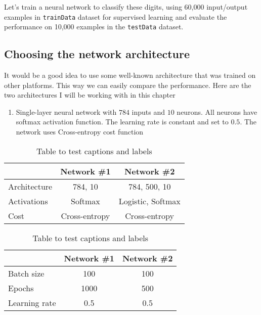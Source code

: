 Let's train a neural network to classify these digits, using 60,000 input/output examples in \texttt{trainData} dataset for supervised learning and evaluate the performance on 10,000 examples in the \texttt{testData} dataset.

\subsection{Choosing the network architecture}
It would be a good idea to use some well-known architecture that was trained on other platforms. This way we can easily compare the performance. Here are the two architectures I will be working with in this chapter
\begin{enumerate}
  \item Single-layer neural network with $784$ inputs and $10$ neurons. All neurons have softmax activation function. The learning rate is constant and set to $0.5$. The network uses Cross-entropy cost function
\end{enumerate}

\begin{table}[h!]
  \centering
  
  \begin{tabularx}{0.75\textwidth}{|H|CC|}
    \hline
                    & Network \#1       & Network \#2 \\
    \hline
    Architecture    & 784, 10           & 784, 500, 10       \\
    Activations     & Softmax           & Logistic, Softmax \\
    Cost            & Cross-entropy     & Cross-entropy \\
    \hline
  \end{tabularx}
  
  \caption{Table to test captions and labels}
  \label{table:architectures}
\end{table}

\begin{table}[h!]
  \centering
  
  \begin{tabularx}{0.75\textwidth}{|H|CC|}
    \hline
                    & Network \#1       & Network \#2 \\
    \hline
    Batch size      & 100               & 100 \\
    Epochs          & 1000              & 500 \\
    Learning rate   & 0.5               & 0.5 \\
    \hline
  \end{tabularx}
  
  \caption{Table to test captions and labels}
  \label{table:training}
\end{table}

